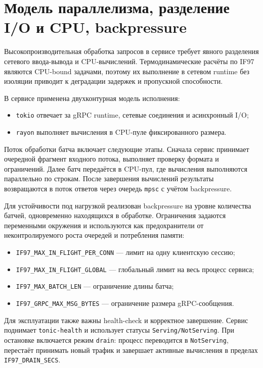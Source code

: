 \section{Модель параллелизма, разделение I/O и CPU, backpressure}

Высокопроизводительная обработка запросов в сервисе требует явного разделения сетевого ввода-вывода и CPU-вычислений.  
Термодинамические расчёты по IF97 являются CPU-bound задачами, поэтому их выполнение в сетевом runtime без изоляции приводит к деградации задержек и пропускной способности.  

В сервисе применена двухконтурная модель исполнения:
\begin{itemize}
\item \texttt{tokio} отвечает за gRPC runtime, сетевые соединения и асинхронный I/O;  
\item \texttt{rayon} выполняет вычисления в CPU-пуле фиксированного размера.  
\end{itemize}

Поток обработки батча включает следующие этапы.  
Сначала сервис принимает очередной фрагмент входного потока, выполняет проверку формата и ограничений.  
Далее батч передаётся в CPU-пул, где вычисления выполняются параллельно по строкам.  
После завершения вычислений результаты возвращаются в поток ответов
через очередь \texttt{mpsc} с учётом backpressure.

Для устойчивости под нагрузкой реализован backpressure на уровне количества батчей, одновременно находящихся в обработке.  
Ограничения задаются переменными окружения и используются как предохранители от неконтролируемого роста очередей и потребления памяти:
\begin{itemize}
\item \texttt{IF97\_MAX\_IN\_FLIGHT\_PER\_CONN} --- лимит на одну клиентскую сессию;  
\item \texttt{IF97\_MAX\_IN\_FLIGHT\_GLOBAL} --- глобальный лимит на весь процесс сервиса;  
\item \texttt{IF97\_MAX\_BATCH\_LEN} --- ограничение длины батча;  
\item \texttt{IF97\_GRPC\_MAX\_MSG\_BYTES} --- ограничение размера gRPC-сообщения.  
\end{itemize}

Для эксплуатации также важны health-check и корректное завершение.  
Сервис поднимает \texttt{tonic-health} и использует статусы \texttt{Serving/NotServing}.  
При остановке включается режим \texttt{drain}:
процесс переводится в \texttt{NotServing},
перестаёт принимать новый трафик
и завершает активные вычисления в пределах \texttt{IF97\_DRAIN\_SECS}.  

